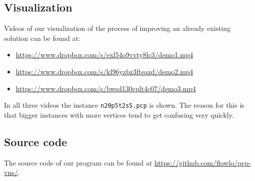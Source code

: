 \documentclass[paper=a4,fontsize=12pt]{scrartcl}
\begin{document}
\subsection{Visualization}

Videos of our visualization of the process of improving an already existing solution can be found at:


\begin{itemize}
	\item \url{https://www.dropbox.com/s/exl54o9vvty8lc3/demo1.mp4}
	\item \url{https://www.dropbox.com/s/kl96yzbz3fteazd/demo2.mp4}
	\item \url{https://www.dropbox.com/s/bwsd130cplt4c07/demo3.mp4}
\end{itemize}

In all three videos the instance \texttt{n20p5t2s5.pcp} is shown. The reason for this is that bigger instances with more vertices tend to get confusing very quickly.


\subsection{Source code}

The source code of our program can be found at \url{https://github.com/flowlo/pcp-vns/}.

\end{document}

